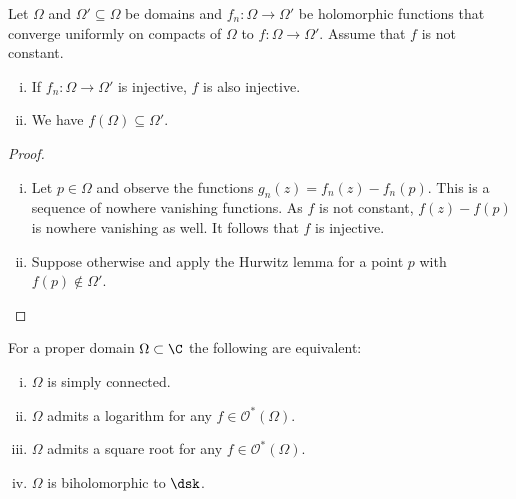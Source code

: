 \begin{izrek}[Hurwitz]
Let $\Omega$ and $\Omega' \subseteq \Omega$ be domains and
$f_n \colon \Omega \to \Omega'$ be holomorphic functions that
converge uniformly on compacts of $\Omega$ to
$f \colon \Omega \to \Omega'$. Assume that $f$ is not constant.

\begin{enumerate}[i)]
\item If $f_n \colon \Omega \to \Omega'$ is injective, $f$ is also
injective.
\item We have $f(\Omega) \subseteq \Omega'$.
\end{enumerate}
\end{izrek}

\begin{proof}
\phantom{a}
\begin{enumerate}[i)]
\item Let $p \in \Omega$ and observe the functions
$g_n(z) = f_n(z) - f_n(p)$. This is a sequence of nowhere vanishing
functions. As $f$ is not constant, $f(z) - f(p)$ is nowhere
vanishing as well. It follows that $f$ is injective.
\item Suppose otherwise and apply the Hurwitz lemma for a point
$p$ with $f(p) \not \in \Omega'$. \qedhere
\end{enumerate}
\end{proof}

\begin{izrek}
For a proper domain $\Omega \subset \C$ the following are
equivalent:

\begin{enumerate}[i)]
\item $\Omega$ is simply connected.
\item $\Omega$ admits a logarithm for any
$f \in \mathcal{O}^*(\Omega)$.
\item $\Omega$ admits a square root for any
$f \in \mathcal{O}^*(\Omega)$.
\item $\Omega$ is biholomorphic to $\dsk$.
\end{enumerate}
\end{izrek}

